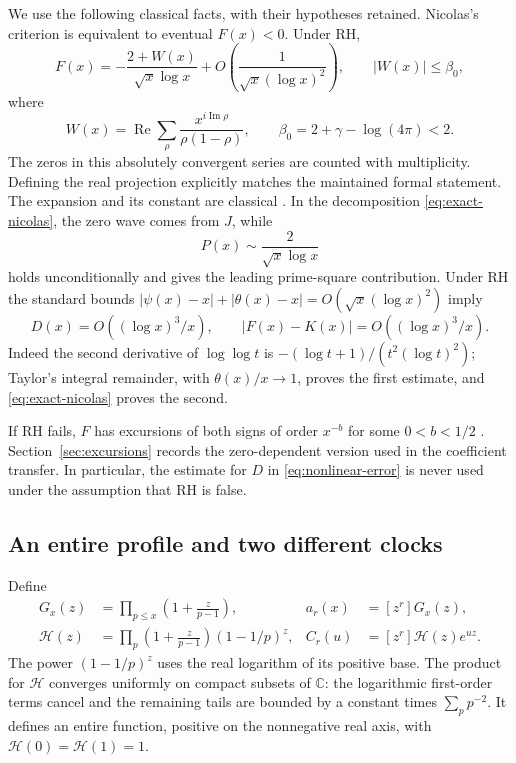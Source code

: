 \documentclass[11pt]{article}
\theoremstyle{definition}
\begin{document}
We use the following classical facts, with their hypotheses retained.
Nicolas's criterion is equivalent to eventual $F(x)<0$. Under RH,
\begin{equation}\label{eq:nicolas-wave}
 F(x)=-\frac{2+W(x)}{\sqrt{x}\log x}
          +O\!\left(\frac1{\sqrt{x}(\log x)^2}\right),
 \qquad |W(x)|\le\beta_0,
\end{equation}
where
\[
 W(x)=\operatorname{Re}\sum_\rho
       \frac{x^{i\operatorname{Im}\rho}}{\rho(1-\rho)},
 \qquad \beta_0=2+\gamma-\log(4\pi)<2.
\]
The zeros in this absolutely convergent series are counted with
multiplicity. Defining the real projection explicitly matches the
maintained formal statement. The expansion and its constant are
classical \cite[Proposition~2.1]{Nicolas2012}. In the decomposition
\eqref{eq:exact-nicolas}, the zero wave comes from $J$, while
\[
 P(x)\sim\frac2{\sqrt{x}\log x}
\]
holds unconditionally and gives the leading prime-square contribution.
Under RH the standard bounds
$|\psi(x)-x|+|\theta(x)-x|=O(\sqrt{x}(\log x)^2)$ imply
\begin{equation}\label{eq:nonlinear-error}
 D(x)=O((\log x)^3/x),\qquad
 |F(x)-K(x)|=O((\log x)^3/x).
\end{equation}
Indeed the second derivative of $\log\log t$ is
$-(\log t+1)/(t^2(\log t)^2)$; Taylor's integral remainder, with
$\theta(x)/x\to1$, proves the first estimate, and
\eqref{eq:exact-nicolas} proves the second.

If RH fails, $F$ has excursions of both signs of order $x^{-b}$ for
some $0<b<1/2$ \cite{Nicolas1983,Nicolas2012}. Section~\ref{sec:excursions}
records the zero-dependent version used in the coefficient transfer.
In particular, the estimate for $D$ in \eqref{eq:nonlinear-error}
is never used under the assumption that RH is false.

\subsection{An entire profile and two different clocks}
Define
\begin{equation}\label{eq:profile-def}
\begin{aligned}
 G_x(z)&=\prod_{p\le x}\left(1+\frac z{p-1}\right),&
 a_r(x)&=[z^r]G_x(z),\\
 \mathcal H(z)&=\prod_p
       \left(1+\frac z{p-1}\right)(1-1/p)^z,&
 C_r(u)&=[z^r]\mathcal H(z)e^{uz}.
\end{aligned}
\end{equation}
The power $(1-1/p)^z$ uses the real logarithm of its positive base.
The product for $\mathcal H$ converges uniformly on compact subsets
of $\mathbb C$: the logarithmic first-order terms cancel and the
remaining tails are bounded by a constant times $\sum_p p^{-2}$.
It defines an entire function, positive on the nonnegative real axis,
with $\mathcal H(0)=\mathcal H(1)=1$.
\end{document}
